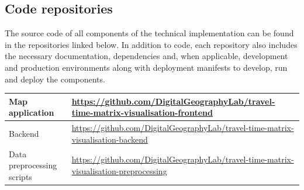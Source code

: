 \begin{appendices}
\subsection{Code repositories}

The source code of all components of the technical implementation
can be found in the repositories linked below.
In addition to code, each repository also includes
the necessary documentation,
dependencies and, when applicable,
development and production environments along with deployment manifests
to develop, run and deploy the components.

\begin{table}[H]
	\centering
	\begin{tabular}{ | L{0.38\textwidth} | L{0.62\textwidth} | }
		\hline
		Map application
		& \url{https://github.com/DigitalGeographyLab/travel-time-matrix-visualisation-frontend}
		\\
		\hline
		Backend
		& \url{https://github.com/DigitalGeographyLab/travel-time-matrix-visualisation-backend}
		\\
		\hline
		Data preprocessing scripts
		& \url{https://github.com/DigitalGeographyLab/travel-time-matrix-visualisation-preprocessing}
		\\
		\hline
	\end{tabular}
\end{table}

\end{appendices}
